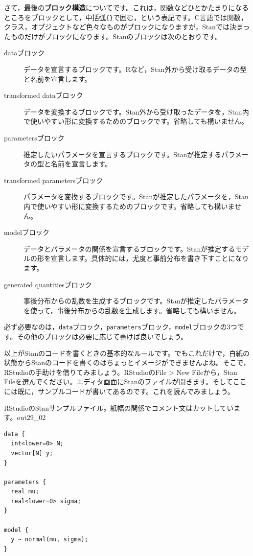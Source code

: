 \documentclass{ltjbook}
\begin{document}
さて，最後の\textbf{ブロック構造}についてです。これは，関数などひとかたまりになるところをブロックとして，中括弧\verb|{}|で囲む，という表記です。C言語では関数，クラス，オブジェクトなど色々なものがブロックになりますが，Stanでは決まったものだけがブロックになります。Stanのブロックは次のとおりです。

\begin{description}
  \item [dataブロック] データを宣言するブロックです。Rなど，Stan外から受け取るデータの型と名前を宣言します。
  \item [transformed dataブロック] データを変換するブロックです。Stan外から受け取ったデータを，Stan内で使いやすい形に変換するためのブロックです。省略しても構いません。
  \item [parametersブロック] 推定したいパラメータを宣言するブロックです。Stanが推定するパラメータの型と名前を宣言します。
  \item [transformed parametersブロック] パラメータを変換するブロックです。Stanが推定したパラメータを，Stan内で使いやすい形に変換するためのブロックです。省略しても構いません。
  \item [modelブロック] データとパラメータの関係を宣言するブロックです。Stanが推定するモデルの形を宣言します。具体的には，尤度と事前分布を書き下すことになります。
  \item [generated quantitiesブロック] 事後分布からの乱数を生成するブロックです。Stanが推定したパラメータを使って，事後分布からの乱数を生成します。省略しても構いません。
\end{description}

必ず必要なのは，\verb|data|ブロック，\verb|parameters|ブロック，\verb|model|ブロックの3つです。その他のブロックは必要に応じて書けば良いでしょう。

以上がStanのコードを書くときの基本的なルールです。でもこれだけで，白紙の状態からStanのコードを書くのはちょっとイメージができませんよね。そこで，RStudioの手助けを借りてみましょう。RStudioのFile > New Fileから，Stan Fileを選んでください。エディタ画面にStanのファイルが開きます。そしてここには既に，サンプルコードが書いてあるのです。これを読んでみましょう。

\begin{Rscreen}{RStudioのStanサンプルファイル。紙幅の関係でコメント文はカットしています。}{out29_02}
	\begin{verbatim}
data {
  int<lower=0> N;
  vector[N] y;
}

parameters {
  real mu;
  real<lower=0> sigma;
}

model {
  y ~ normal(mu, sigma);
}

  \end{verbatim}
\end{Rscreen}
\end{document}
